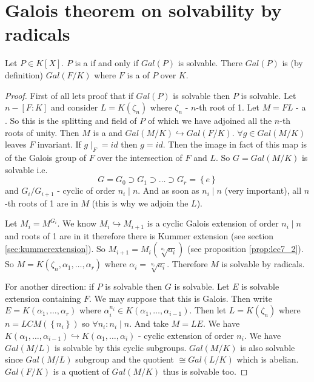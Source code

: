 \section{Galois theorem on solvability by radicals}

\begin{theorem}
  Let $P \in K\left[X\right]$. $P$ is a
   if and only if
  $Gal\left(P\right)$ is solvable. There
  $Gal\left(P\right)$ is (by definition) $Gal\left(F/K\right)$ where
  $F$ is a  of $P$ over $K$.
  \begin{proof}
    First of all lets proof that if $Gal\left(P\right)$ is solvable
    then $P$ is solvable. Let $n - \left[F:K\right]$ and consider
    $L = K\left(\zeta_n\right)$ where $\zeta_n$ - $n$-th root of 1.
    Let $M = FL$ - a . So this is the
    splitting and field of $P$ of which we have adjoined all the
    $n$-th roots of unity.  Then $M$ is a
     and
    $Gal\left(M/K\right) \hookrightarrow Gal\left(F/K\right)$.
    $\forall g \in Gal\left(M/K\right)$ leaves $F$ invariant.
    If $g\mid_F = id$ then $g = id$. Then the image in fact of this
    map is of the Galois group of $F$ over the intersection of $F$ and
    $L$.  So $G = Gal\left(M/K\right)$ is solvable i.e.
    \[
    G = G_0 \supset G_1 \supset \dots \supset G_r = \left\{e\right\}
    \]
    and $G_i/G_{i+1}$ - cyclic of order $n_i \mid n$. And as soon as
    $n_i \mid n$ (very important), all $n$-th roots of 1 are in $M$
    (this is why we adjoin the $L$).

    Let $M_i = M^{G_i}$. We know $M_i \hookrightarrow M_{i+1}$ is a
    cyclic Galois extension of order $n_i \mid n$ and roots of 1 are
    in it therefore there is Kummer extension (see section
    \ref{sec:kummerextension}). So
    $M_{i+1} = M_i\left(\sqrt[n_i]{a_i}\right)$ (see proposition
    \ref{prop:lec7_2}).
    So $M = K\left(\zeta_n, \alpha_1, \dots, \alpha_r\right)$ where
    $\alpha_i = \sqrt[n_i]{a_i}$. Therefore $M$ is solvable by
    radicals.

    For another direction: if $P$ is solvable then $G$ is
    solvable. Let $E$ is solvable extension containing $F$. We may
    suppose that this is Galois. Then write
    $E = K\left(\alpha_1, \dots, \alpha_r\right)$ where
    $\alpha_i^{n_i} \in K\left(\alpha_1, \dots,
    \alpha_{i-1}\right)$. Then let $L = K\left(\zeta_n\right)$
    where $n = LCM\left(\left\{n_i\right\}\right)$ so
    $\forall n_i: n_i \mid n$. And
    take $M = LE$. We have
    $K\left(\alpha_1, \dots, \alpha_{i-1}\right) \hookrightarrow
    K\left(\alpha_1, \dots, \alpha_i\right)$ - cyclic extension of
    order $n_i$. We have $Gal\left(M/L\right)$ is solvable by this
    cyclic subgroups. $Gal\left(M/K\right)$ is also solvable since
    $Gal\left(M/L\right)$ subgroup and the quotient
    $\cong Gal\left(L/K\right)$ which is abelian.
    $Gal\left(F/K\right)$ is a quotient of $Gal\left(M/K\right)$ thus
    is solvable too.    
  \end{proof}
  \label{thm:lec8_1}
\end{theorem}

